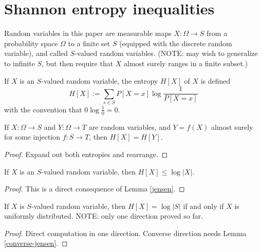 \chapter{Shannon entropy inequalities}

Random variables in this paper are measurable maps $X : \Omega \to S$ from a probability space $\Omega$ to a finite set $S$ (equipped with the discrete random variable), and called $S$-valued random variables.
(NOTE: may wish to generalize to infinite $S$, but then require that $X$ almost surely ranges in a finite subset.)

\begin{definition}[Entropy]
  \label{entropy-def}
  \leanok
  If $X$ is an $S$-valued random variable, the entropy $H[X]$ of $X$ is defined
  $$ H[X] := \sum_{s \in S} P[X=x] \log \frac{1}{P[X=x]}$$
  with the convention that $0 \log \frac{1}{0} = 0$.
\end{definition}

\begin{lemma}\label{relabeled-entropy}   If $X: \Omega \to S$ and $Y: \Omega \to T$ are random variables, and $Y = f(X)$ almost surely for some injection $f: S \to T$, then $H[X] = H[Y]$.
\end{lemma}

\begin{proof} Expand out both entropies and rearrange.
\end{proof}

\begin{lemma}\label{jensen-bound}
\leanok
If $X$ is an $S$-valued random variable, then $H[X] \leq \log |X|$.
\end{lemma}

\begin{proof}
  This is a direct consequence of Lemma \ref{jensen}.
\end{proof}

\begin{lemma}\label{uniform-entropy}
If $X$ is $S$-valued random variable, then $H[X] = \log |S|$ if and only if $X$ is uniformly distributed. NOTE: only one direction proved so far.
\end{lemma}

\begin{proof} Direct computation in one direction.  Converse direction needs Lemma \ref{converse-jensen}.
\end{proof}

